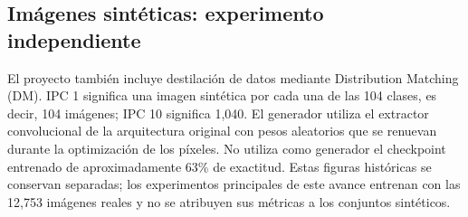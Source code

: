 \subsection{Imágenes sintéticas: experimento independiente}

El proyecto también incluye destilación de datos mediante Distribution Matching
(DM). IPC 1 significa una imagen sintética por cada una de las 104 clases, es
decir, 104 imágenes; IPC 10 significa 1,040. El generador utiliza el extractor
convolucional de la arquitectura original con pesos aleatorios que se renuevan
durante la optimización de los píxeles. No utiliza como generador el checkpoint
entrenado de aproximadamente 63\% de exactitud. Estas figuras históricas se
conservan separadas; los experimentos principales de este avance entrenan con
las 12,753 imágenes reales y no se atribuyen sus métricas a los conjuntos sintéticos.

